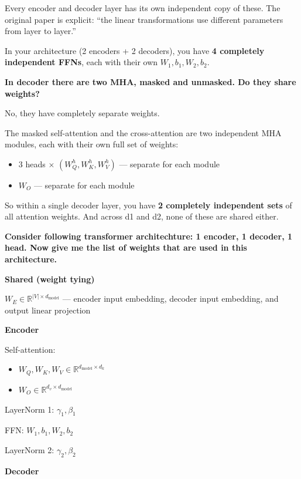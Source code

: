 Every encoder and decoder layer has its own independent copy of these. The original paper is explicit: ``the linear transformations use different parameters from layer to layer.''

In your architecture (2 encoders + 2 decoders), you have \textbf{4 completely independent FFNs}, each with their own $W_1, b_1, W_2, b_2$.

\bigskip

\textbf{In decoder there are two MHA, masked and unmasked. Do they share weights?}

No, they have completely separate weights.

The masked self-attention and the cross-attention are two independent MHA modules, each with their own full set of weights:
\begin{itemize}
  \item 3 heads $\times$ $(W_Q^h, W_K^h, W_V^h)$ --- separate for each module
  \item $W_O$ --- separate for each module
\end{itemize}

So within a single decoder layer, you have \textbf{2 completely independent sets} of all attention weights. And across d1 and d2, none of these are shared either.

\bigskip

\textbf{Consider following transformer architechture: 1 encoder, 1 decoder, 1 head. Now give me the list of weights that are used in this architecture.}

\textbf{Shared (weight tying)}

$W_E \in \mathbb{R}^{|V| \times d_{\text{model}}}$ --- encoder input embedding, decoder input embedding, and output linear projection

\medskip

\textbf{Encoder}

Self-attention:
\begin{itemize}
  \item $W_Q, W_K, W_V \in \mathbb{R}^{d_{\text{model}} \times d_k}$
  \item $W_O \in \mathbb{R}^{d_v \times d_{\text{model}}}$
\end{itemize}

LayerNorm 1: $\gamma_1, \beta_1$

FFN: $W_1, b_1, W_2, b_2$

LayerNorm 2: $\gamma_2, \beta_2$

\medskip

\textbf{Decoder}

